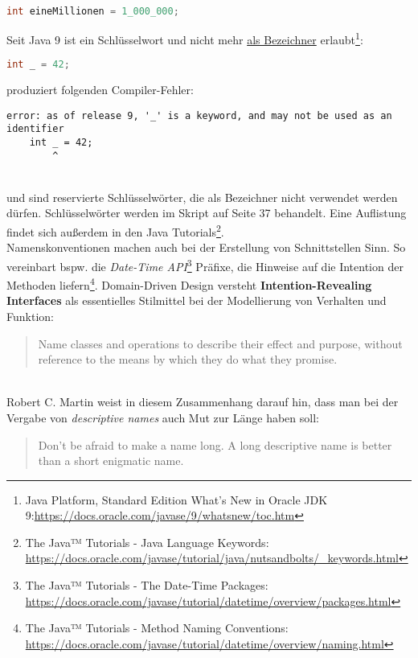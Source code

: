 \begin{lstlisting}[language=java]
int eineMillionen = 1_000_000;
\end{lstlisting}

Seit Java 9 ist \code{_} ein Schlüsselwort und nicht mehr \underline{als Bezeichner} erlaubt\footnote{
    Java Platform, Standard Edition What’s New in Oracle JDK 9:\url{https://docs.oracle.com/javase/9/whatsnew/toc.htm}
}:

\begin{lstlisting}[language=java]
int _ = 42;
\end{lstlisting}

produziert folgenden Compiler-Fehler:

\begin{lstlisting}[language=text]
error: as of release 9, '_' is a keyword, and may not be used as an identifier
    int _ = 42;
        ^
\end{lstlisting}\\



 und  sind reservierte Schlüsselwörter, die als Bezeichner nicht verwendet werden dürfen.
Schlüsselwörter werden im Skript auf Seite 37 behandelt. Eine Auflistung findet sich außerdem in den Java
Tutorials\footnote{
    The Java™ Tutorials - Java Language Keywords: \url{https://docs.oracle.com/javase/tutorial/java/nutsandbolts/\_keywords.html}
}.\\

Namenskonventionen machen auch bei der Erstellung von Schnittstellen Sinn.
So vereinbart bspw. die \textit{Date-Time API}\footnote{
    The Java™ Tutorials - The Date-Time Packages: \url{https://docs.oracle.com/javase/tutorial/datetime/overview/packages.html}
}
Präfixe, die Hinweise auf die Intention der Methoden liefern\footnote{
    The Java™ Tutorials - Method Naming Conventions: \url{https://docs.oracle.com/javase/tutorial/datetime/overview/naming.html}
}.
Domain-Driven Design\cite{Eva04} versteht \textbf{Intention-Revealing Interfaces} als essentielles Stilmittel bei
der Modellierung von Verhalten und Funktion:

    \blockquote[{\cite[247]{Eva04}}]{
        Name classes and operations to describe their effect and purpose, without reference to the means by which they
        do what they promise.
    }\\

Robert C. Martin weist in diesem Zusammenhang darauf hin, dass man bei der Vergabe von \textit{descriptive names} auch Mut zur
Länge haben soll:

    \blockquote[{\cite[39]{Mar08}}]{
        Don't be afraid to make a name long. A long descriptive name is better than a short enigmatic name.
    }




